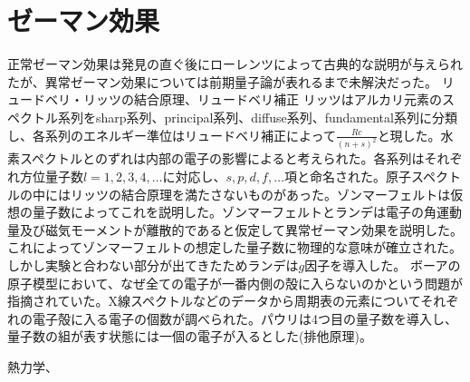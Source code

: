 \section{ゼーマン効果}
	正常ゼーマン効果は発見の直ぐ後にローレンツによって古典的な説明が与えられたが、異常ゼーマン効果については前期量子論が表れるまで未解決だった。
	リュードベリ・リッツの結合原理、リュードベリ補正
	リッツはアルカリ元素のスペクトル系列をsharp系列、principal系列、diffuse系列、fundamental系列に分類し、各系列のエネルギー準位はリュードベリ補正によって$\frac{Rc}{(n+s)^2}$と現した。水素スペクトルとのずれは内部の電子の影響によると考えられた。各系列はそれぞれ方位量子数$l = 1,2,3,4,\ldots$に対応し、$s,p,d,f,\ldots$項と命名された。原子スペクトルの中にはリッツの結合原理を満たさないものがあった。ゾンマーフェルトは仮想の量子数によってこれを説明した。ゾンマーフェルトとランデは電子の角運動量及び磁気モーメントが離散的であると仮定して異常ゼーマン効果を説明した。これによってゾンマーフェルトの想定した量子数に物理的な意味が確立された。しかし実験と合わない部分が出てきたためランデは$g$因子を導入した。
	ボーアの原子模型において、なぜ全ての電子が一番内側の殻に入らないのかという問題が指摘されていた。X線スペクトルなどのデータから周期表の元素についてそれぞれの電子殻に入る電子の個数が調べられた。パウリは4つ目の量子数を導入し、量子数の組が表す状態には一個の電子が入るとした(排他原理)。


熱力学、